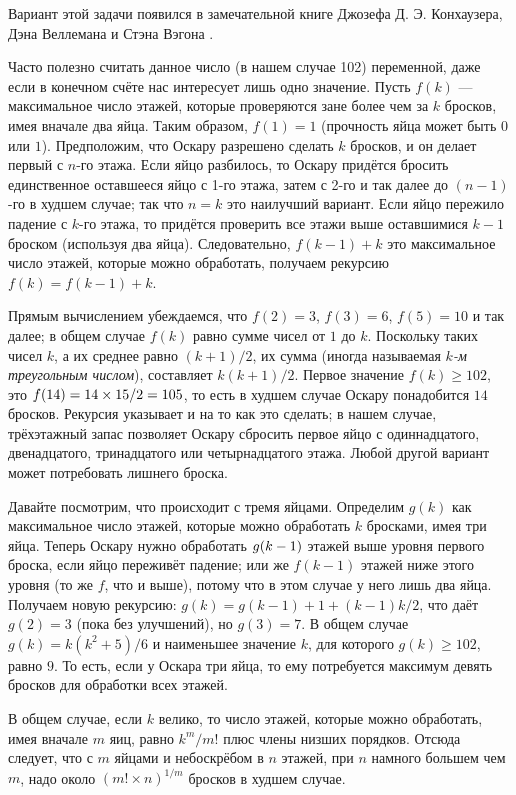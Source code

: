 Вариант этой задачи появился в замечательной книге Джозефа Д. Э. Конхаузера, Дэна Веллемана и Стэна Вэгона \cite{42}.

Часто полезно считать данное число (в нашем случае 102) переменной, даже если в конечном счёте нас интересует лишь одно значение.
Пусть $f(k)$ --- максимальное число этажей, которые проверяются зане более чем за $k$ бросков, имея вначале два яйца.
Таким образом, $f(1) = 1$ (прочность яйца может быть $0$ или $1$).
Предположим, что Оскару разрешено сделать $k$ бросков, и он делает первый с $n$-го этажа.
Если яйцо разбилось, то Оскару придётся бросить единственное оставшееся яйцо с 1-го этажа, затем с 2-го и так далее до $(n-1)$-го в худшем случае;
так что $n = k$ это наилучший вариант.
Если яйцо пережило падение с $k$-го этажа, то придётся проверить все этажи выше оставшимися $k-1$ броском (используя два яйца).
Следовательно, $f(k - 1) + k$ это максимальное число этажей, которые можно обработать,
получаем рекурсию $f(k) = f(k - 1) + k$.

Прямым вычислением убеждаемся, что $f(2) = 3$, $f(3) = 6$, $f(5) = 10$ и так далее; в общем случае $f(k)$ равно сумме чисел от $1$ до $k$.
Поскольку таких чисел $k$, а их среднее равно $(k + 1)/2$, их сумма (иногда называемая \emph{$k$-м треугольным числом}), составляет $k(k + 1)/2$.
Первое значение $f(k)\ge 102$, это $f(14) \z= 14 \times 15/2 \z= 105$, то есть в худшем случае Оскару понадобится $14$ бросков.
Рекурсия указывает и на то как это сделать;
в нашем случае, трёхэтажный запас позволяет Оскару сбросить первое яйцо с одиннадцатого, двенадцатого, тринадцатого или четырнадцатого этажа.
Любой другой вариант может потребовать лишнего броска.

Давайте посмотрим, что происходит с тремя яйцами.
Определим $g(k)$ как максимальное число этажей, которые можно обработать $k$ бросками, имея три яйца.
Теперь Оскару нужно обработать $g(k \z- 1)$ этажей выше уровня первого броска, если яйцо переживёт падение;
или же $f(k - 1)$ этажей ниже этого уровня (то же $f$, что и выше), потому что в этом случае у него лишь два яйца.
Получаем новую рекурсию: $g(k) = g(k-1) + 1 + (k - 1)k/2$, что даёт $g(2) = 3$ (пока без улучшений), но $g(3) = 7$.
В общем случае $g(k)=k(k^2+5)/6$ и наименьшее значение $k$, для которого $g(k)\ge 102$, равно $9$.
То есть, если у Оскара три яйца, то ему потребуется максимум девять бросков для обработки всех этажей.

В общем случае, если $k$ велико, то число этажей, которые можно обработать, имея вначале $m$ яиц, равно $k^m/m!$ плюс члены низших порядков.
Отсюда следует, что с $m$ яйцами и небоскрёбом в $n$ этажей, при $n$ намного большем чем $m$, надо около $(m!\times n)^{1/m}$ бросков в худшем случае.

